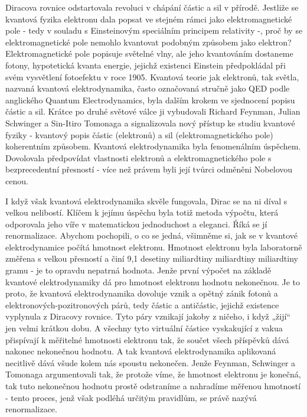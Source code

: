   Diracova rovnice odstartovala revoluci v chápání částic a sil v přírodě. Jestliže se kvantová
  fyzika elektronu dala popsat ve stejném rámci jako elektromagnetické pole - tedy v souladu s
  Einsteinovým speciálním principem relativity -, proč by se elektromagnetické pole nemohlo
  kvantovat podobným způsobem jako elektron? Elektromagnetické pole popisuje světelné vlny, ale jeho
  kvantováním dostaneme fotony, hypotetická kvanta energie, jejichž existenci Einstein předpokládal
  při svém vysvětlení fotoefektu v roce 1905. Kvantová teorie jak elektronů, tak světla, nazvaná
  kvantová elektrodynamika, často označovaná stručně jako QED podle anglického Quantum
  Electrodynamics, byla dalším krokem ve sjednocení popisu částic a sil. Krátce po druhé světové
  válce ji vybudovali Richard Feynman, Julian Schwinger a Sin-Itiro Tomonaga a signalizovala nový
  přístup ke studiu kvantové fyziky - kvantový popis částic (elektronů) a sil (elektromagnetického
  pole) koherentním způsobem. Kvantová elektrodynamika byla fenomenálním úspěchem. Dovolovala
  předpovídat vlastnosti elektronů a elektromagnetického pole s bezprecedentní přesností - více než
  právem byli její tvůrci odměněni Nobelovou cenou. 
  
  I když však kvantová elektrodynamika skvěle fungovala, Dirac se na ni díval s velkou nelibostí.
  Klíčem k jejímu úspěchu byla totiž metoda výpočtu, která odporovala jeho víře v matematickou
  jednoduchost a eleganci. Říká se jí renormalizace. Abychom pochopili, o co se jedná, všimněme si,
  jak se v kvantové elektrodynamice počítá hmotnost elektronu. Hmotnost elektronu byla laboratorně
  změřena s velkou přesností a činí 9,1 desetiny miliardtiny miliardtiny miliardtiny gramu - je to
  opravdu nepatrná hodnota. Jenže první výpočet na základě kvantové elektrodynamiky dá pro hmotnost
  elektronu hodnotu nekonečnou. Je to proto, že kvantová elektrodynamika dovoluje vznik a opětný
  zánik fotonů a elektronových-pozitronových párů, tedy částic a antičástic, jejichž existence
  vyplynula z Diracovy rovnice. Tyto páry vznikají jakoby z ničeho, i když „žijí“ jen velmi krátkou
  dobu. A všechny tyto virtuální částice vyskakující z vakua přispívají k měřitelné hmotnosti
  elektronu tak, že součet všech příspěvků dává nakonec nekonečnou hodnotu. A tak kvantová
  elektrodynamika aplikovaná necitlivě dává všude kolem nás spoustu nekonečen. Jenže Feynman,
  Schwinger a Tomonaga argumentovali tak, že protože víme, že hmotnost elektronu je konečná, tak
  tuto nekonečnou hodnotu prostě odstraníme a nahradíme měřenou hmotností - tento proces, jenž však
  podléhá určitým pravidlům, se právě nazývá renormalizace. 
  
